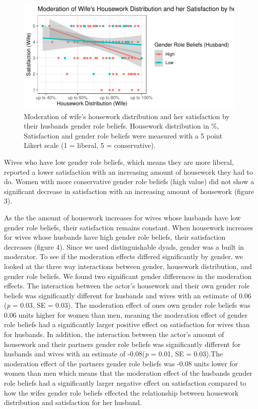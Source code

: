 \documentclass[
  man,floatsintext]{apa6}
\begin{document}
\begin{figure}
\centering
\includegraphics{Final_Paper_files/figure-latex/unnamed-chunk-58-1.pdf}
\caption{\label{fig:unnamed-chunk-58}Moderation of wife's housework distribution and her satisfaction by their husbands gender role beliefs. Housework distribution in \%, Satisfaction and gender role beliefs were measured with a 5 point Likert scale (1 = liberal, 5 = conservative).}
\end{figure}

Wives who have low gender role beliefs, which means they are more liberal, reported a lower satisfaction with an increasing amount of housework they had to do. Women with more conservative gender role beliefs (high value) did not show a significant decrease in satisfaction with an increasing amount of housework (figure 3).

As the the amount of housework increases for wives whose husbands have low gender role beliefs, their satisfaction remains constant. When housework increases for wives whose husbands have high gender role beliefs, their satisfaction decreases (figure 4).
Since we used distinguishable dyads, gender was a built in moderator. To see if the moderation effects differed significantly by gender, we looked at the three way interactions between gender, housework distribution, and gender role beliefs. We found two significant gender differences in the moderation effects. The interaction between the actor's housework and their own gender role beliefs was significantly different for husbands and wives with an estimate of 0.06 (\emph{p} = 0.03, SE = 0.03). The moderation effect of ones own gender role beliefs was 0.06 units higher for women than men, meaning the moderation effect of gender role beliefs had a significantly larger positive effect on satisfaction for wives than for husbands.
In addition, the interaction between the actor's amount of housework and their partners gender role beliefs was significantly different for husbands and wives with an estimate of -0.08(\emph{p} = 0.01, SE = 0.03).The moderation effect of the partners gender role beliefs was -0.08 units lower for women than men which means that the moderation effect of the husbands gender role beliefs had a significantly larger negative effect on satisfaction compared to how the wifes gender role beliefs effected the relationship between housework distribution and satisfaction for her husband.
\end{document}
